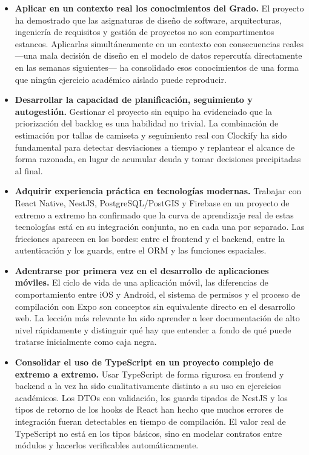 \begin{itemize}
    \item \textbf{Aplicar en un contexto real los conocimientos del Grado.} El proyecto ha demostrado que las asignaturas de diseño de software, arquitecturas, ingeniería de requisitos y gestión de proyectos no son compartimentos estancos. Aplicarlas simultáneamente en un contexto con consecuencias reales ---una mala decisión de diseño en el modelo de datos repercutía directamente en las semanas siguientes--- ha consolidado esos conocimientos de una forma que ningún ejercicio académico aislado puede reproducir.

    \item \textbf{Desarrollar la capacidad de planificación, seguimiento y autogestión.} Gestionar el proyecto sin equipo ha evidenciado que la priorización del backlog es una habilidad no trivial. La combinación de estimación por tallas de camiseta y seguimiento real con Clockify ha sido fundamental para detectar desviaciones a tiempo y replantear el alcance de forma razonada, en lugar de acumular deuda y tomar decisiones precipitadas al final.

    \item \textbf{Adquirir experiencia práctica en tecnologías modernas.} Trabajar con React Native, NestJS, PostgreSQL/PostGIS y Firebase en un proyecto de extremo a extremo ha confirmado que la curva de aprendizaje real de estas tecnologías está en su integración conjunta, no en cada una por separado. Las fricciones aparecen en los bordes: entre el frontend y el backend, entre la autenticación y los guards, entre el ORM y las funciones espaciales.

    \item \textbf{Adentrarse por primera vez en el desarrollo de aplicaciones móviles.} El ciclo de vida de una aplicación móvil, las diferencias de comportamiento entre iOS y Android, el sistema de permisos y el proceso de compilación con Expo son conceptos sin equivalente directo en el desarrollo web. La lección más relevante ha sido aprender a leer documentación de alto nivel rápidamente y distinguir qué hay que entender a fondo de qué puede tratarse inicialmente como caja negra.

    \item \textbf{Consolidar el uso de TypeScript en un proyecto complejo de extremo a extremo.} Usar TypeScript de forma rigurosa en frontend y backend a la vez ha sido cualitativamente distinto a su uso en ejercicios académicos. Los DTOs con validación, los guards tipados de NestJS y los tipos de retorno de los hooks de React han hecho que muchos errores de integración fueran detectables en tiempo de compilación. El valor real de TypeScript no está en los tipos básicos, sino en modelar contratos entre módulos y hacerlos verificables automáticamente.


\end{itemize}
